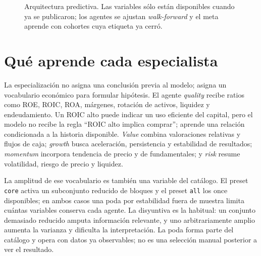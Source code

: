 \begin{figure}[H]
  \centering
  \caption{Arquitectura predictiva. Las variables sólo están disponibles cuando ya se publicaron;
  los agentes se ajustan \textit{walk-forward} y el meta aprende con cohortes cuya etiqueta ya cerró.}
  \label{fig:arquitectura}
\end{figure}

\section{Qué aprende cada especialista}

La especialización no asigna una conclusión previa al modelo; asigna un vocabulario económico para
formular hipótesis. El agente \textit{quality} recibe ratios como ROE, ROIC, ROA, márgenes, rotación
de activos, liquidez y endeudamiento. Un ROIC alto puede indicar un uso eficiente del capital, pero
el modelo no recibe la regla ``ROIC alto implica comprar''; aprende una relación condicionada a la
historia disponible. \textit{Value} combina valoraciones relativas y flujos de caja; \textit{growth}
busca aceleración, persistencia y estabilidad de resultados; \textit{momentum} incorpora tendencia
de precio y de fundamentales; y \textit{risk} resume volatilidad, riesgo de precio y liquidez.

La amplitud de ese vocabulario es también una variable del catálogo. El preset \texttt{core} activa
un subconjunto reducido de bloques y el preset \texttt{all} los once disponibles; en ambos casos una
poda por estabilidad fuera de muestra limita cuántas variables conserva cada agente. La disyuntiva
es la habitual: un conjunto demasiado reducido amputa información relevante, y uno arbitrariamente
amplio aumenta la varianza y dificulta la interpretación. La poda forma parte del catálogo y opera
con datos ya observables; no es una selección manual posterior a ver el resultado.

